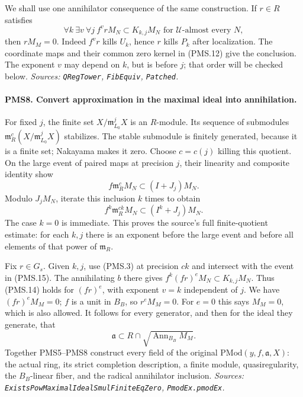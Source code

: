 We shall use one annihilator consequence of the same construction.
If $r\in R$ satisfies
\[
 \forall k\ \exists v\ \forall j\ 
 f^v rM_N\subset K_{k,j}M_N
       \text{ for }\mathscr U\text{-almost every }N,             \tag{PMS.14}
\]
then $rM_M=0$.  Indeed $f^vr$ kills $U_k$, hence $r$ kills $P_k$
after localization.  The coordinate maps and their common zero
kernel in (PMS.12) give the conclusion.  The exponent $v$ may
depend on $k$, but is before $j$; that order will be checked below.
\hfill\textit{Sources: \texttt{QRegTower}, \texttt{FibEquiv},
\texttt{Patched}.}

\paragraph{PMS8. Convert approximation in the maximal ideal into annihilation.}
\label{claim:PMS8}
For fixed $j$, the finite set $X/\mathfrak m_{L_0}^jX$ is an
$R$-module.  Its sequence of submodules
$\mathfrak m_R^c(X/\mathfrak m_{L_0}^jX)$ stabilizes.  The stable
submodule is finitely generated, because it is a finite set;
Nakayama makes it zero.  Choose $c=c(j)$ killing this quotient.
On the large event of paired maps at precision $j$, their
linearity and composite identity show
\[
 f\mathfrak m_R^c M_N\subset (I+J_j)M_N.
\]
Modulo $J_jM_N$, iterate this inclusion $k$ times to obtain
\[
 f^k\mathfrak m_R^{ck}M_N\subset(I^k+J_j)M_N.    \tag{PMS.15}
\]
The case $k=0$ is immediate.  This proves the source's full
finite-quotient estimate:
for each $k,j$ there is an exponent before the large event and
before all elements of that power of $\mathfrak m_R$.

Fix $r\in G_s$.  Given $k,j$, use (PMS.3) at precision $ck$ and
intersect with the event in (PMS.15).  The annihilating $b$ there
gives
$f^k(fr)^eM_N\subset K_{k,j}M_N$.
Thus (PMS.14) holds for $(fr)^e$, with exponent $v=k$ independent
of $j$.  We have $(fr)^eM_M=0$; $f$ is a unit in $B_B$, so
$r^eM_M=0$.  For $e=0$ this says $M_M=0$, which is also allowed.
It follows for every generator, and then for the ideal they
generate, that
\[
 \mathfrak a\subset
 R\cap\sqrt{\operatorname{Ann}_{B_B}M_M}.        \tag{PMS.16}
\]
Together PMS5--PMS8 construct every field of the original
$\mathrm{PMod}(y,f,\mathfrak a,X)$: the actual ring, its strict
completion description, a finite module, quasiregularity, the
$B_B$-linear fiber, and the radical annihilator inclusion.
\hfill\textit{Sources: \texttt{ExistsPowMaximalIdealSmulFiniteEqZero},
\texttt{PmodEx.pmodEx}.}

